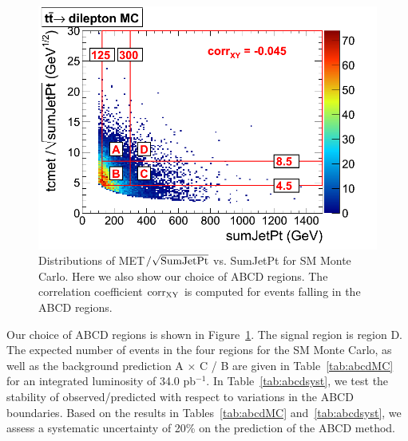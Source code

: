 \begin{figure}[tb]
\begin{center}
\includegraphics[width=0.75\linewidth]{ttdil_uncor_38X.png}
\caption{\label{fig:abcdMC}\protect Distributions of MET$/\sqrt{\rm SumJetPt}$ vs. 
SumJetPt for SM Monte Carlo.  Here we also show our choice of ABCD regions. The correlation coefficient
${\rm corr_{XY}}$ is computed for events falling in the ABCD regions.}
\end{center}
\end{figure}


Our choice of ABCD regions is shown in Figure~\ref{fig:abcdMC}.
The signal region is region D.  The expected number of events 
in the four regions for the SM Monte Carlo, as well as the background 
prediction A $\times$ C / B are given in Table~\ref{tab:abcdMC} for an integrated
luminosity of 34.0 pb$^{-1}$. In Table~\ref{tab:abcdsyst}, we test the stability of
observed/predicted with respect to variations in the ABCD boundaries. 
Based on the results in Tables~\ref{tab:abcdMC} and~\ref{tab:abcdsyst}, we assess
a systematic uncertainty of 20\% on the prediction of the ABCD method.




